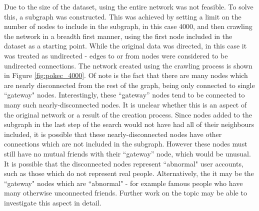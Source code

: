 \documentclass[bsc,frontabs,twoside,singlespacing,parskip,deptreport]{infthesis}     %
\begin{document}
Due to the size of the dataset, using the entire network was not feasible. To solve this, a subgraph was constructed. This was achieved by setting a limit on the number of nodes to include in the subgraph, in this case 4000, and then crawling the network in a breadth first manner, using the first node included in the dataset as a starting point. While the original data was directed, in this case it was treated as undirected - edges to or from nodes were considered to be undirected connections. The network created using the crawling process is shown in Figure \ref{fig:pokec_4000}. Of note is the fact that there are many nodes which are nearly disconnected from the rest of the graph, being only connected to single ``gateway" nodes. Interestingly, these ``gateway'' nodes tend to be connected to many such nearly-disconnected nodes. It is unclear whether this is an aspect of the original network or a result of the creation process. Since nodes added to the subgraph in the last step of the search would not have had all of their neighbours included, it is possible that these nearly-disconnected nodes have other connections which are not included in the subgraph. However these nodes must still have no mutual friends with their ``gateway'' node, which would be unusual. It is possible that the disconnected nodes represent ``abnormal" user accounts, such as those which do not represent real people. Alternatively, the it may be the ``gateway" nodes which are ``abnormal" - for example famous people who have many otherwise unconnected friends. Further work on the topic may be able to investigate this aspect in detail.
\end{document}
